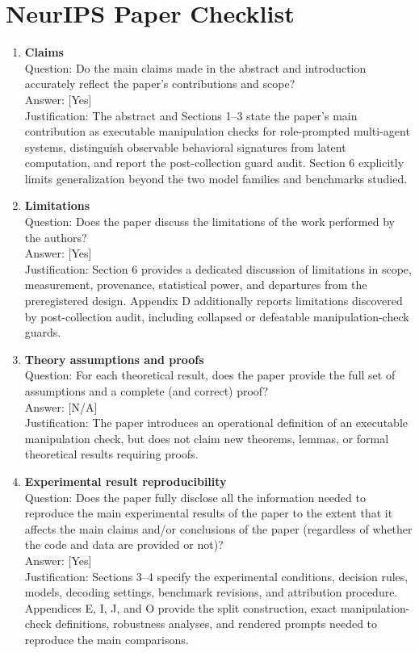 \section*{NeurIPS Paper Checklist}

\begin{enumerate}[leftmargin=*]

\item \textbf{Claims}\\
Question: Do the main claims made in the abstract and introduction accurately reflect the paper's
contributions and scope?\\
Answer: [Yes]\\
Justification: The abstract and Sections 1--3 state the paper's main contribution as executable
manipulation checks for role-prompted multi-agent systems, distinguish observable behavioral
signatures from latent computation, and report the post-collection guard audit. Section 6 explicitly
limits generalization beyond the two model families and benchmarks studied.

\item \textbf{Limitations}\\
Question: Does the paper discuss the limitations of the work performed by the authors?\\
Answer: [Yes]\\
Justification: Section 6 provides a dedicated discussion of limitations in scope, measurement,
provenance, statistical power, and departures from the preregistered design. Appendix D
additionally reports limitations discovered by post-collection audit, including collapsed or
defeatable manipulation-check guards.

\item \textbf{Theory assumptions and proofs}\\
Question: For each theoretical result, does the paper provide the full set of assumptions and a
complete (and correct) proof?\\
Answer: [N/A]\\
Justification: The paper introduces an operational definition of an executable manipulation check,
but does not claim new theorems, lemmas, or formal theoretical results requiring proofs.

\item \textbf{Experimental result reproducibility}\\
Question: Does the paper fully disclose all the information needed to reproduce the main
experimental results of the paper to the extent that it affects the main claims and/or conclusions of
the paper (regardless of whether the code and data are provided or not)?\\
Answer: [Yes]\\
Justification: Sections 3--4 specify the experimental conditions, decision rules, models, decoding
settings, benchmark revisions, and attribution procedure. Appendices E, I, J, and O provide the split
construction, exact manipulation-check definitions, robustness analyses, and rendered prompts needed
to reproduce the main comparisons.


\end{enumerate}
